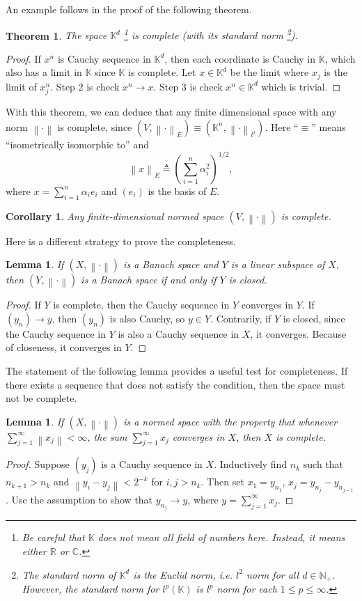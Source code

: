 \documentclass[12pt,a4paper]{article}
\numberwithin{equation}{section}
\theoremstyle{mystyle}
\newtheorem{theorem}[definition]{Theorem}
\newtheorem{lemma}[definition]{Lemma}
\newtheorem{corollary}[definition]{Corollary}
\newcommand{\R}{\mathbb{R}}
\newcommand{\N}{\mathbb{N}}
\newcommand{\K}{\mathbb{K}}
\newcommand{\norm}[1]{\left\lVert #1 \right\rVert}
\begin{document}
	An example follows in the proof of the following theorem.
	\begin{theorem}
		The space $\K^d$
		\footnote{Be careful that $\K$ does not mean all field of numbers here. Instead, it means either $\R$ or $\mathbb{C}$.}
		 is complete (with its standard norm
		 \footnote{The standard norm of $\K^d$ is the Euclid norm, i.e. $l^2$ norm for all $d\in \N_+$. However, the standard norm for $l^p(\K)$ is $l^p$ norm for each $1\leq p\leq \infty$.}).
	\end{theorem}
	\begin{proof}
		If $x^n$ is Cauchy sequence in $\K^d$, then each coordinate is Cauchy in $\K$, which also has a limit in $\K$ since $\K$ is complete. Let $x\in \K^d$ be the limit where $x_j$ is the limit of $x^n_j$. Step 2 is check $x^n\to x$. Step 3 is check $x^n\in \K^d$ which is trivial.
	\end{proof}
	With this theorem, we can deduce that any finite dimensional space with any norm $\norm{\cdot}$ is complete, since $(V,\norm{\cdot}_E)\equiv (\K^n, \norm{\cdot}_{l^2})$. Here ``$\equiv$'' means ``isometrically isomorphic to'' and 
	$$
	\norm{x}_E\triangleq \left(\sum_{i=1}^n \alpha_i^2\right)^{1/2},
	$$
	where $x=\sum_{i=1}^n \alpha_i e_i$ and $(e_i)$ is the basis of $E$.
	\begin{corollary}
		Any finite-dimensional normed space $(V,\norm{\cdot})$ is complete.
	\end{corollary}
	
	Here is a different strategy to prove the completeness.
	\begin{lemma}
		If $(X,\norm{\cdot})$ is a Banach space and $Y$ is a linear subspace of $X$, then $(Y,\norm{\cdot})$ is a Banach space if and only if $Y$ is closed.
	\end{lemma}
	\begin{proof}
		If $Y$ is complete, then the Cauchy sequence in $Y$ converges in $Y$. If $(y_n)\to y$, then $(y_n)$ is also Cauchy, so $y\in Y$. Contrarily, if $Y$ is closed, since the Cauchy sequence in $Y$ is also a Cauchy sequence in $X$, it converges. Because of closeness, it converges in $Y$.
	\end{proof}
	The statement of the following lemma provides a useful test for completeness. If there exists a sequence that does not satisfy the condition, then the space must not be complete.
	\begin{lemma}
		If $(X,\norm{\cdot})$ is a normed space with the property that whenever $\sum_{j=1}^\infty \norm{x_j}<\infty$, the sum $\sum_{j=1}^\infty x_j$ converges in $X$, then $X$ is complete.
	\end{lemma}
	\begin{proof}
		Suppose $(y_j)$ is a Cauchy sequence in $X$. Inductively find $n_k$ such that $n_{k+1}>n_k$ and $\norm{y_i-y_j}<2^{-k}$ for $i,j>n_k$. Then set $x_1=y_{n_1}$, $x_j=y_{n_j}-y_{n_{j-1}}$. Use the assumption to show that $y_{n_j}\to y$, where $y=\sum_{j=1}^\infty x_j$.
	\end{proof}
\end{document}
